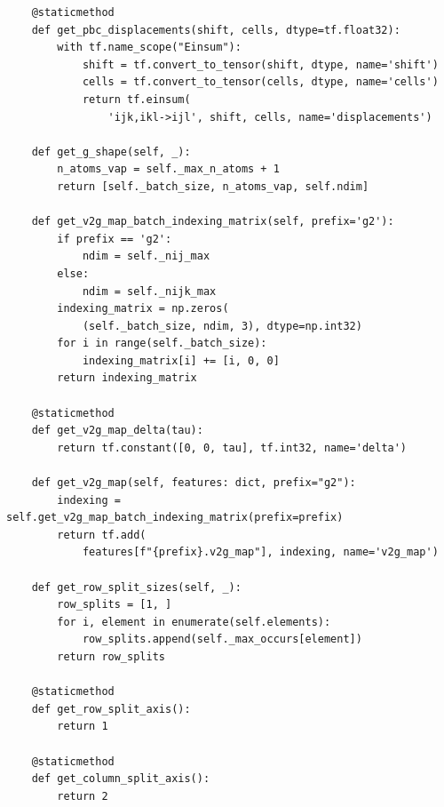 \documentclass[final,1p,times]{elsarticle}
\begin{document}
\begin{verbatim}
    @staticmethod
    def get_pbc_displacements(shift, cells, dtype=tf.float32):
        with tf.name_scope("Einsum"):
            shift = tf.convert_to_tensor(shift, dtype, name='shift')
            cells = tf.convert_to_tensor(cells, dtype, name='cells')
            return tf.einsum(
                'ijk,ikl->ijl', shift, cells, name='displacements')

    def get_g_shape(self, _):
        n_atoms_vap = self._max_n_atoms + 1
        return [self._batch_size, n_atoms_vap, self.ndim]

    def get_v2g_map_batch_indexing_matrix(self, prefix='g2'):
        if prefix == 'g2':
            ndim = self._nij_max
        else:
            ndim = self._nijk_max
        indexing_matrix = np.zeros(
            (self._batch_size, ndim, 3), dtype=np.int32)
        for i in range(self._batch_size):
            indexing_matrix[i] += [i, 0, 0]
        return indexing_matrix

    @staticmethod
    def get_v2g_map_delta(tau):
        return tf.constant([0, 0, tau], tf.int32, name='delta')

    def get_v2g_map(self, features: dict, prefix="g2"):
        indexing = self.get_v2g_map_batch_indexing_matrix(prefix=prefix)
        return tf.add(
            features[f"{prefix}.v2g_map"], indexing, name='v2g_map')

    def get_row_split_sizes(self, _):
        row_splits = [1, ]
        for i, element in enumerate(self.elements):
            row_splits.append(self._max_occurs[element])
        return row_splits

    @staticmethod
    def get_row_split_axis():
        return 1

    @staticmethod
    def get_column_split_axis():
        return 2
\end{verbatim}
\end{document}
